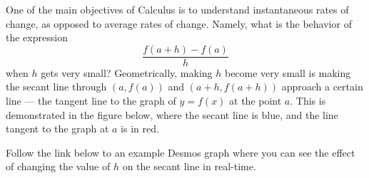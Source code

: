 \documentclass{ximera}
\begin{document}
One of the main objectives of Calculus is to understand instantaneous rates of change, as opposed to average rates of change. Namely, what is the behavior of the expression 
$$\frac{f(a+h)-f(a)}{h}$$
when $h$ gets very small? Geometrically, making $h$ become very small is making the secant line through $(a,f(a))$ and $(a+h,f(a+h))$ approach a certain line --- the tangent line to the graph of $y=f(x)$ at the point $a$. This is demonstrated in the figure below, where the secant line is blue, and the line tangent to the graph at $a$ is in red. 

\begin{image}[2.5in]
		\end{image}

Follow the link below to an example Desmos graph where you can see the effect of changing the value of $h$ on the secant line in real-time.
\end{document}

